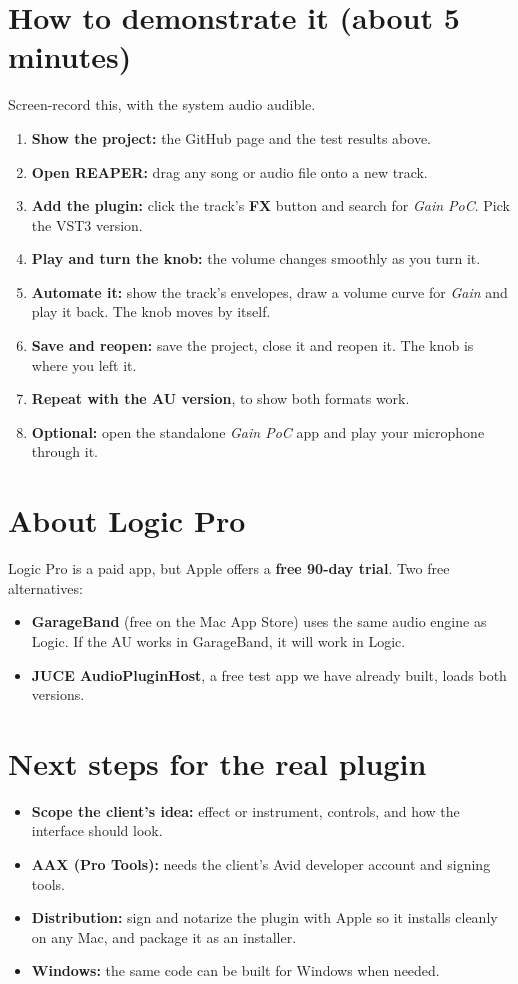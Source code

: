 \documentclass[11pt,a4paper]{article}
\begin{document}
\section{How to demonstrate it (about 5 minutes)}
Screen-record this, with the system audio audible.
\begin{enumerate}
  \item \textbf{Show the project:} the GitHub page and the test results above.
  \item \textbf{Open REAPER:} drag any song or audio file onto a new track.
  \item \textbf{Add the plugin:} click the track's \textbf{FX} button and search for
        \emph{Gain PoC}. Pick the VST3 version.
  \item \textbf{Play and turn the knob:} the volume changes smoothly as you turn it.
  \item \textbf{Automate it:} show the track's envelopes, draw a volume curve for
        \emph{Gain} and play it back. The knob moves by itself.
  \item \textbf{Save and reopen:} save the project, close it and reopen it.
        The knob is where you left it.
  \item \textbf{Repeat with the AU version}, to show both formats work.
  \item \textbf{Optional:} open the standalone \emph{Gain PoC} app and play your
        microphone through it.
\end{enumerate}

\section{About Logic Pro}
Logic Pro is a paid app, but Apple offers a \textbf{free 90-day trial}. Two free alternatives:
\begin{itemize}
  \item \textbf{GarageBand} (free on the Mac App Store) uses the same audio engine as
        Logic. If the AU works in GarageBand, it will work in Logic.
  \item \textbf{JUCE AudioPluginHost}, a free test app we have already built, loads both versions.
\end{itemize}

\section{Next steps for the real plugin}
\begin{itemize}
  \item \textbf{Scope the client's idea:} effect or instrument, controls, and how the interface should look.
  \item \textbf{AAX (Pro Tools):} needs the client's Avid developer account and signing tools.
  \item \textbf{Distribution:} sign and notarize the plugin with Apple so it installs cleanly
        on any Mac, and package it as an installer.
  \item \textbf{Windows:} the same code can be built for Windows when needed.
\end{itemize}
\end{document}
